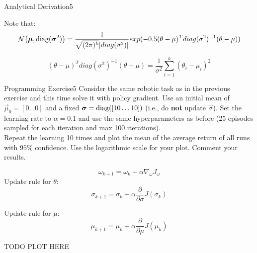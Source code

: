 \begin{questions}
\begin{question}{Analytical Derivation}{5}
\begin{answer}
Note that:
 	 		\begin{equation}
 	 		\mathcal{N}\big({\boldsymbol{\mu}}, \operatorname{\mathrm{diag}}({\boldsymbol{\sigma}}^2)\big)=\frac{1}{\sqrt{(2\pi)^k} |diag(\sigma^2)|} exp(-0.5 (\theta-\mu)^T diag(\sigma^2)^{-1} (\theta-\mu))
 	 		\end{equation}	 	
 		
 	\begin{equation}
(\theta-\mu)^T diag(\sigma^2)^{-1} (\theta-\mu) = \frac{1}{\sigma^2} \sum_{i=1}^k (\theta_i - \mu_i)^2
  \end{equation}

	\end{answer}

\end{question}


\begin{question}{Programming Exercise}{5}
	Consider the same robotic task as in the previous exercise and this time solve it with policy gradient. 
	Use an initial mean of $\vec \mu_0 = [0 \dots 0]$ and a fixed ${\boldsymbol{\sigma}} = \operatorname{\mathrm{diag}}([10 \dots 10])$ (i.e., do \textbf{not} update $\vec\sigma$). Set the learning rate to $\alpha=0.1$ and use the same hyperparameters as before (25 episodes sampled for each iteration and max 100 iterations).\\
	Repeat the learning 10 times and plot the mean of the average return of all runs with $95\%$ confidence.
	Use the logarithmic scale for your plot. Comment your results.
	
	\begin{answer}
	\begin{equation}
		\omega_{k+1}=\omega_k + \alpha \nabla_{\omega} J_{\omega}
	\end{equation}
Update rule for $\theta$:
		\begin{equation}
		\sigma_{k+1}=\sigma_k + \alpha \frac{\partial}{\partial \sigma} J({\sigma_k})
		\end{equation}
		
		Update rule for $\mu$:
		\begin{equation}
		\mu_{k+1}=\mu_k + \alpha \frac{\partial}{\partial \mu}  J({\mu_k})
		\end{equation}



TODO PLOT HERE
	\end{answer}
\end{question}





\end{questions}
